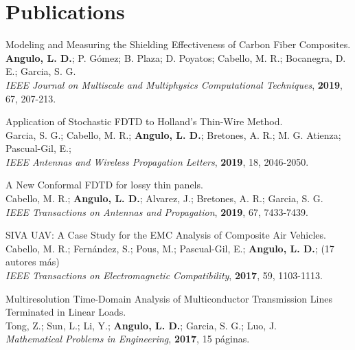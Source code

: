 \documentclass[margin,line]{res}
\begin{document}
\section{\sc Publications}
\begin{minipage}{\textwidth}
	Modeling and Measuring the Shielding Effectiveness of Carbon Fiber Composites.\\
	\textbf{Angulo, L. D.}; P. Gómez; B. Plaza; D. Poyatos; Cabello, M. R.; Bocanegra, D. E.; Garcia, S. G.\\
	{\it IEEE Journal on Multiscale and Multiphysics Computational Techniques}, \textbf{2019}, 67, 207-213.
\end{minipage}

\begin{minipage}{\textwidth}
	Application of Stochastic FDTD to Holland's Thin-Wire Method.\\
	Garcia, S. G.; Cabello, M. R.; \textbf{Angulo, L. D.}; Bretones, A. R.; M. G. Atienza; Pascual-Gil, E.; \\
	{\it IEEE Antennas and Wireless Propagation Letters}, \textbf{2019}, 18, 2046-2050.
\end{minipage}

\begin{minipage}{\textwidth}
	A New Conformal FDTD for lossy thin panels.\\
	Cabello, M. R.; \textbf{Angulo, L. D.}; Alvarez, J.;  Bretones, A. R.;  Garcia, S. G.\\
	{\it IEEE Transactions on Antennas and Propagation}, \textbf{2019}, 67, 7433-7439.
\end{minipage}
\begin{minipage}{\textwidth}
	SIVA UAV: A Case Study for the EMC Analysis of Composite Air Vehicles.\\
	Cabello, M. R.; Fernández, S.; Pous, M.; Pascual-Gil, E.; \textbf{Angulo, L. D.}; (17 autores más)\\
	{\it IEEE Transactions on Electromagnetic Compatibility}, \textbf{2017}, 59, 1103-1113.
\end{minipage}

\begin{minipage}{\textwidth}
	Multiresolution Time-Domain Analysis of Multiconductor Transmission Lines Terminated in Linear Loads.\\
	Tong, Z.; Sun, L.; Li, Y.; \textbf{Angulo, L. D.}; Garcia, S. G.; Luo, J.\\
	{\it Mathematical Problems in Engineering}, {\bf 2017}, 15 páginas.
\end{minipage}
\end{document}
